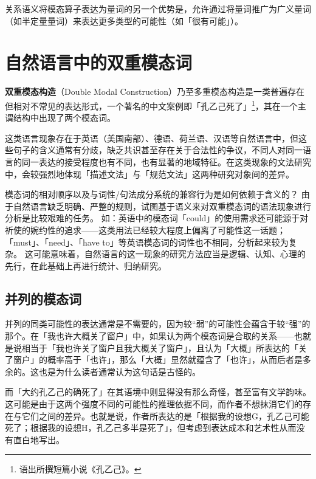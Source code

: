\documentclass[fontset=ubuntu]{ctexart}
\newcommand{\textul}[1]{\makebox{\underline{#1}}}
\begin{document}

			关系语义将模态算子表达为量词的另一个优势是，允许通过将量词推广为广义量词（如半定量量词）来表达更多类型的可能性（如「很有可能」）。

		\section{自然语言中的双重模态词}
			
			\textbf{双重模态构造}（Double Modal Construction）乃至多重模态构造是一类普遍存在但相对不常见的表达形式，一个著名的中文案例即「\textul{大约}孔乙己\textul{的确}死了」\footnote{语出\citet{魯迅1923吶喊}所撰短篇小说《孔乙己》。}，其在一个主谓结构中出现了两个模态词。

			这类语言现象存在于英语（美国南部）、德语、荷兰语、汉语等自然语言中，但这些句子的含义通常有分歧，缺乏共识甚至存在关于合法性的争议，不同人对同一语言的同一表达的接受程度也有不同，也有显著的地域特征。在这类现象的文法研究中，会较强烈地体现「描述文法」与「规范文法」这两种研究对象间的差异。
			
			模态词的相对顺序以及与词性/句法成分系统的兼容行为是如何依赖于含义的？
			由于自然语言缺乏明确、严整的规则，试图基于语义来对双重模态词的语法现象进行分析是比较艰难的任务。
			如：英语中的模态词「could」的使用需求还可能源于对祈使的婉约性的追求——这类用法已经较大程度上偏离了可能性这一话题；「must」、「need」、「have to」等英语模态词的词性也不相同，分析起来较为复杂。
			这可能意味着，自然语言的这一现象的研究方法应当是逻辑、认知、心理的先行，在此基础上再进行统计、归纳研究。

			\subsection{并列的模态词}

				并列的同类可能性的表达通常是不需要的，因为较“弱”的可能性会蕴含于较“强”的那个。在「我也许大概关了窗户」中，如果认为两个模态词是合取的关系——也就是说相当于「我也许关了窗户且我大概关了窗户」，且认为「大概」所表达的「关了窗户」的概率高于「也许」，那么「大概」显然就蕴含了「也许」，从而后者是多余的。这也是为什么读者通常认为这句话是古怪的。

				而「大约孔乙己的确死了」在其语境中则显得没有那么奇怪，甚至富有文学韵味。这可能是由于这两个强度不同的可能性的推理依据不同，而作者不想抹消它们的存在与它们之间的差异。也就是说，作者所表达的是「根据我的设想G，孔乙己可能死了；根据我的设想H，孔乙己多半是死了」，但考虑到表达成本和艺术性从而没有直白地写出。
\end{document}
